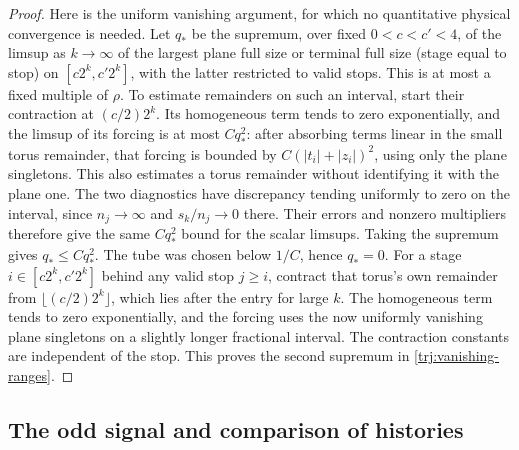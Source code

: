\begin{proof}
Here is the uniform vanishing argument, for which no quantitative
physical convergence is needed.  Let \(q_*\) be the supremum, over
fixed \(0<c<c'<4\), of the limsup as \(k\to\infty\) of the largest
plane full size or terminal full size (stage equal to stop) on
\([c2^k,c'2^k]\), with the latter restricted to valid stops.  This is at most
a fixed multiple of \(\rho\).  To estimate remainders on such an
interval, start their contraction at \((c/2)2^k\).  Its homogeneous
term tends to zero exponentially, and the limsup of its forcing is at
most \(Cq_*^2\): after absorbing terms linear in the small torus
remainder, that forcing is bounded by \(C(|t_i|+|z_i|)^2\), using only
the plane singletons.  This also estimates a torus remainder without
identifying it with the plane one.  The two diagnostics have discrepancy
tending uniformly to zero on the interval, since \(n_j\to\infty\)
and \(s_k/n_j\to0\) there.  Their errors and nonzero multipliers
therefore give the same \(Cq_*^2\) bound for the scalar limsups.
Taking the supremum gives \(q_*\le Cq_*^2\).  The tube was chosen below
\(1/C\), hence \(q_*=0\).  For a stage \(i\in[c2^k,c'2^k]\) behind
any valid stop \(j\ge i\), contract that torus's own remainder from
\(\lfloor(c/2)2^k\rfloor\), which lies after the entry for large \(k\).
The homogeneous term tends to zero exponentially, and the forcing uses
the now uniformly vanishing plane singletons on a slightly longer
fractional interval.  The contraction constants are independent of
the stop.  This proves the second supremum in
\eqref{trj:vanishing-ranges}.
\end{proof}

\subsection{The odd signal and comparison of histories}

